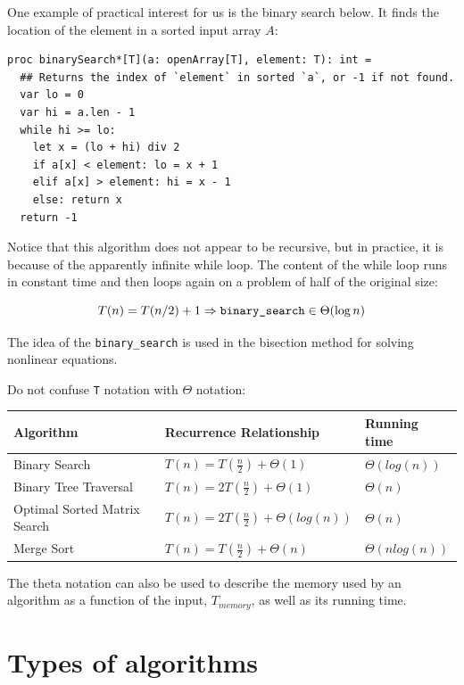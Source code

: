 \documentclass[justified, sixbynine]{tufte-book}
\def\ft{\small\tt}
\theoremstyle{plain}%
\newtheorem * {corollary}{Corollary}
\theoremstyle{definition}
\theoremstyle{remark}
\newtheorem * {remark}{Remark}
\newtheorem * {note}{Note}
\begin{document}
\begin{fullwidth}
One example of practical interest for us is the binary search below. It finds the location of the element in a sorted input array $A$:

\begin{lstlisting}
proc binarySearch*[T](a: openArray[T], element: T): int =
  ## Returns the index of `element` in sorted `a`, or -1 if not found.
  var lo = 0
  var hi = a.len - 1
  while hi >= lo:
    let x = (lo + hi) div 2
    if a[x] < element: lo = x + 1
    elif a[x] > element: hi = x - 1
    else: return x
  return -1
\end{lstlisting}

Notice that this algorithm does not appear to be recursive, but in practice, it is because of the apparently infinite while loop. The content of the while loop runs in constant time and then loops again on a problem of half of the original size:

\begin{equation}
T(n)=T(n/2)+1\Rightarrow \text{{\tt binary\_search}}\in \Theta(\log n)
\end{equation}

The idea of the {\ft binary\_search} is used in the bisection method for solving nonlinear equations.

Do not confuse {\ft T} notation with $\Theta$ notation:

\begin{table}
\begin{tabular}{|l|l|l|}\hline
Algorithm & Recurrence Relationship & Running time \\ \hline
Binary Search & $T(n) = T(\frac n 2) + \Theta (1)$ & $\Theta(log(n))$ \\ \hline
Binary Tree Traversal & $T(n) = 2T(\frac n 2) + \Theta (1)$ & $\Theta(n)$ \\ \hline
Optimal Sorted Matrix Search & $T(n) = 2T(\frac n 2) + \Theta (log(n))$ & $\Theta(n)$ \\ \hline
Merge Sort & $T(n) = T(\frac n 2) + \Theta (n)$ & $\Theta(n log(n))$ \\ \hline
\end{tabular}
\label{table1}
\end{table}

The theta notation can also be used to describe the memory used by an algorithm as a function of the input, $T_{memory}$, as well as its running time.

\goodbreak\section{Types of algorithms}


\end{fullwidth}
\end{document}
